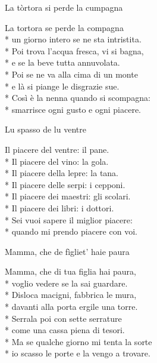 \documentclass[11pt]{book}
\begin{document}
\begin{poem}{La tòrtora si perde la cumpagna}{}
\settowidth{\versewidth}{Un giorno intero se ne sta intristita}
\begin{altverse}
La tortora se perde la compagna\\*
un giorno intero se ne sta intristita.\\*
Poi trova l'acqua fresca, vi si bagna,\\*
e se la beve tutta annuvolata.\\*
Poi se ne va alla cima di un monte\\*
e là si piange le disgrazie sue.\\*
Così è la nenna quando si scompagna:\\*
smarrisce ogni gusto e ogni piacere.
\end{altverse}
\end{poem}

\begin{poem}{Lu spasso de lu ventre}{}
\settowidth{\versewidth}{Il piacere dei maestri: gli scolari}
\begin{altverse}
Il piacere del ventre: il pane.\\*
Il piacere del vino: la gola.\\*
Il piacere della lepre: la tana.\\*
Il piacere delle serpi: i cepponi.\\*
Il piacere dei maestri: gli scolari.\\*
Il piacere dei libri: i dottori.\\*
Sei vuoi sapere il miglior piacere:\\*
quando mi prendo piacere con voi.
\end{altverse}
\end{poem}

\begin{poem}{Mamma, che de fìgliet’ haie paura}{}
\settowidth{\versewidth}{Io scasso le porte e la vengo a trovare.}
\begin{altverse}
Mamma, che di tua figlia hai paura,\\*
voglio vedere se la sai guardare.\\*
Disloca macigni, fabbrica le mura,\\*
davanti alla porta ergile una torre.\\*
Serrala poi con sette serrature\\*
come una cassa piena di tesori.\\*
Ma se qualche giorno mi tenta la sorte\\*
io scasso le porte e la vengo a trovare.
\end{altverse}
\end{poem}
\end{document}
